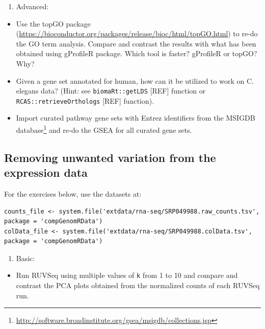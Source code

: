 \documentclass[12pt,]{krantz}
\providecommand{\tightlist}{%
  \setlength{\itemsep}{0pt}\setlength{\parskip}{0pt}}
\renewcommand{\href}[2]{#2\footnote{\url{#1}}}
\begin{document}
\begin{enumerate}
\def\labelenumi{\arabic{enumi}.}
\setcounter{enumi}{2}
\tightlist
\item
  Advanced:
\end{enumerate}

\begin{itemize}
\tightlist
\item
  Use the topGO package (\url{https://bioconductor.org/packages/release/bioc/html/topGO.html}) to re-do the GO term analysis. Compare and contrast the results with what has been obtained using gProfileR package. Which tool is faster? gProfileR or topGO? Why?
\item
  Given a gene set annotated for human, how can it be utilized to work on C. elegans data? (Hint: see \texttt{biomaRt::getLDS} {[}REF{]} function or \texttt{RCAS::retrieveOrthologs} {[}REF{]} function).
\item
  Import curated pathway gene sets with Entrez identifiers from the \href{http://software.broadinstitute.org/gsea/msigdb/collections.jsp}{MSIGDB database} and re-do the GSEA for all curated gene sets.
\end{itemize}

\hypertarget{removing-unwanted-variation-from-the-expression-data}{%
\subsection{Removing unwanted variation from the expression data}\label{removing-unwanted-variation-from-the-expression-data}}

For the exercises below, use the datasets at:

\begin{verbatim}
counts_file <- system.file('extdata/rna-seq/SRP049988.raw_counts.tsv', package = 'compGenomRData')
colData_file <- system.file('extdata/rna-seq/SRP049988.colData.tsv', package = 'compGenomRData')
\end{verbatim}

\begin{enumerate}
\def\labelenumi{\arabic{enumi}.}
\tightlist
\item
  Basic:
\end{enumerate}

\begin{itemize}
\tightlist
\item
  Run RUVSeq using multiple values of \texttt{k} from 1 to 10 and compare and contrast the PCA plots obtained from the normalized counts of each RUVSeq run.
\end{itemize}
\end{document}
